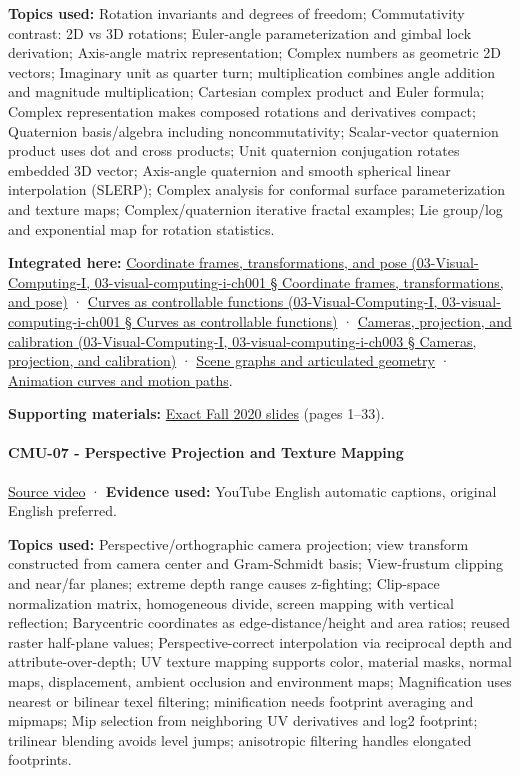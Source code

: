 \textbf{Topics used:} Rotation invariants and degrees of freedom; Commutativity contrast: 2D vs 3D rotations; Euler-angle parameterization and gimbal lock derivation; Axis-angle matrix representation; Complex numbers as geometric 2D vectors; Imaginary unit as quarter turn; multiplication combines angle addition and magnitude multiplication; Cartesian complex product and Euler formula; Complex representation makes composed rotations and derivatives compact; Quaternion basis/algebra including noncommutativity; Scalar-vector quaternion product uses dot and cross products; Unit quaternion conjugation rotates embedded 3D vector; Axis-angle quaternion and smooth spherical linear interpolation (SLERP); Complex analysis for conformal surface parameterization and texture maps; Complex/quaternion iterative fractal examples; Lie group/log and exponential map for rotation statistics.

\textbf{Integrated here:} \href{}{Coordinate frames, transformations, and pose (03-Visual-Computing-I, 03-visual-computing-i-ch001 § Coordinate frames, transformations, and pose)} · \href{}{Curves as controllable functions (03-Visual-Computing-I, 03-visual-computing-i-ch001 § Curves as controllable functions)} · \href{}{Cameras, projection, and calibration (03-Visual-Computing-I, 03-visual-computing-i-ch003 § Cameras, projection, and calibration)} · \hyperref[04-visual-computing-ii-ch029]{Scene graphs and articulated geometry} · \hyperref[04-visual-computing-ii-ch029]{Animation curves and motion paths}.

\textbf{Supporting materials:} \href{https://15462.courses.cs.cmu.edu/fall2020content/lectures/06_3drotations/06_3drotations_slides.pdf}{Exact Fall 2020 slides} (pages 1--33).

\paragraph{CMU-07 - Perspective Projection and Texture Mapping}\label{cmu-07---perspective-projection-and-texture-mapping}

\href{https://www.youtube.com/watch?v=_4Q4O2Kgdo4}{Source video} · \textbf{Evidence used:} YouTube English automatic captions, original English preferred.

\textbf{Topics used:} Perspective/orthographic camera projection; view transform constructed from camera center and Gram-Schmidt basis; View-frustum clipping and near/far planes; extreme depth range causes z-fighting; Clip-space normalization matrix, homogeneous divide, screen mapping with vertical reflection; Barycentric coordinates as edge-distance/height and area ratios; reused raster half-plane values; Perspective-correct interpolation via reciprocal depth and attribute-over-depth; UV texture mapping supports color, material masks, normal maps, displacement, ambient occlusion and environment maps; Magnification uses nearest or bilinear texel filtering; minification needs footprint averaging and mipmaps; Mip selection from neighboring UV derivatives and log2 footprint; trilinear blending avoids level jumps; anisotropic filtering handles elongated footprints.

